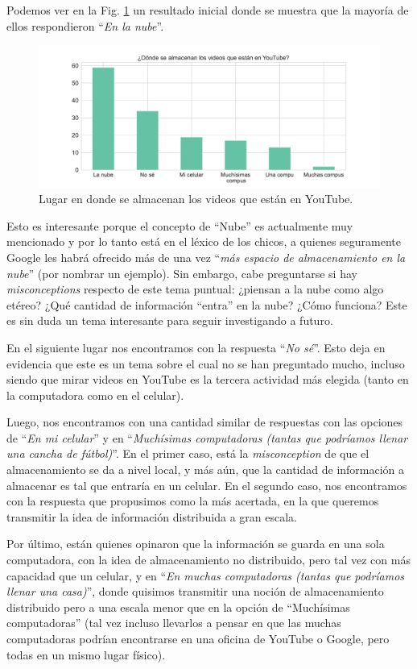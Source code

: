 Podemos ver en la Fig. \ref{fig:analisis8} un resultado inicial donde se muestra que la mayoría de ellos respondieron ``\textit{En la nube}''. 

\begin{figure}[h]
    \centering
    \includegraphics[width=1\textwidth]{images_analisis/8.pdf}
    \caption{Lugar en donde se almacenan los videos que están en YouTube.}
    \label{fig:analisis8}
\end{figure}

Esto es interesante porque el concepto de ``Nube'' es actualmente muy mencionado y por lo tanto está en el léxico de los chicos, a quienes seguramente Google les habrá ofrecido más de una vez ``\textit{más espacio de almacenamiento en la nube}'' (por nombrar un ejemplo). Sin embargo, cabe preguntarse si hay \textit{misconceptions} respecto de este tema puntual: ¿piensan a la nube como algo etéreo? ¿Qué cantidad de información ``entra'' en la nube? ¿Cómo funciona? Este es sin duda un tema interesante para seguir investigando a futuro.

En el siguiente lugar nos encontramos con la respuesta ``\textit{No sé}''. Esto deja en evidencia que este es un tema sobre el cual no se han preguntado mucho, incluso siendo que mirar videos en YouTube es la tercera actividad más elegida (tanto en la computadora como en el celular).

Luego, nos encontramos con una cantidad similar de respuestas con las opciones de ``\textit{En mi celular}'' y en ``\textit{Muchísimas computadoras (tantas que podríamos llenar una cancha de fútbol)}''. En el primer caso, está la \textit{misconception} de que el almacenamiento se da a nivel local, y más aún, que la cantidad de información a almacenar es tal que entraría en un celular. En el segundo caso, nos encontramos con la respuesta que propusimos como la más acertada, en la que queremos transmitir la idea de información distribuida a gran escala.

Por último, están quienes opinaron que la información se guarda en una sola computadora, con la idea de almacenamiento no distribuido, pero tal vez con más capacidad que un celular, y en ``\textit{En muchas computadoras (tantas que podríamos llenar una casa)}'', donde quisimos transmitir una noción de almacenamiento distribuido pero a una escala menor que en la opción de ``Muchísimas computadoras'' (tal vez incluso llevarlos a pensar en que las muchas computadoras podrían encontrarse en una oficina de YouTube o Google, pero todas en un mismo lugar físico).

